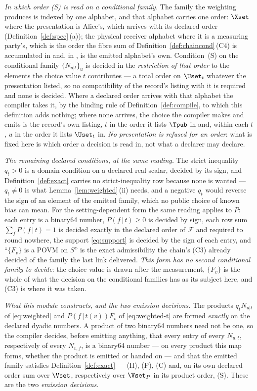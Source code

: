 \begin{definition}
\emph{In which order (S) is read on a conditional family.} The family the
weighting produces is indexed by one alphabet, and that alphabet carries one
order: $\Xset$ where the presentation is Alice's, which arrives with its
declared order (Definition~\ref{def:spec}\,(a)); the physical receiver
alphabet where it is a measuring party's, which is the order the fibre sum of
Definition~\ref{def:chaincond}\,(C4) is accumulated in and, in , is
the emitted alphabet's own. Condition~(S) on the conditional family
$\{N_{u|t}\}_u$ is decided in the \emph{restriction of that order} to the
elements the choice value $t$ contributes --- a total order on $\Uset_t$
whatever the presentation listed, so no compatibility of the record's listing
with it is required and none is decided. Where a declared order arrives with
that alphabet the compiler takes it, by the binding rule of
Definition~\ref{def:compile}, to which this definition adds nothing; where
none arrives, the choice the compiler makes and emits is the record's own
listing, $t$ in the order it lists $\Tpub$ in and, within each $t$, $u$ in the
order it lists $\Uset_t$ in. \emph{No presentation is refused for an order}:
what is fixed here is which order a decision is read in, not what a declarer
may declare.

\emph{The remaining declared conditions, at the same reading.} The strict
inequality $q_t>0$ is a domain condition on a declared real scalar, decided by
its sign, and Definition~\ref{def:exact} carries no
strict-inequality row because none is wanted --- $q_t\ne0$ is what
Lemma~\ref{lem:weighted}\,(ii) needs, and a negative $q_t$ would reverse the
sign of an element of the emitted family, which no public choice of known bias
can mean. For the setting-dependent form the same reading applies to $P$: each
entry is a binary64 number, $P(f\,|\,t)\ge0$ is decided by sign, each row sum
$\sum_fP(f\,|\,t)=1$ is decided exactly in the declared order of
$\mathcal{F}$ and required to round nowhere, the support \eqref{eq:support}
is decided by the sign of each entry, and ``$\{F_v\}$ is a POVM on $S$'' is
the exact admissibility the chain's (C3) already decided of the family the
last link delivered. \emph{This form has no second conditional family to
decide}: the choice value is drawn after the measurement, $\{F_v\}$ is the
whole of what the decision on the conditional families has as its subject
here, and (C3) is where it was taken.

\emph{What this module constructs, and the two emission decisions.} The
products $q_tN_{u|t}$ of \eqref{eq:weighted} and $P(f\,|\,t(v))F_v$ of
\eqref{eq:weighted-t} are formed \emph{exactly} on the declared dyadic
numbers. A product of two binary64 numbers need not be one, so the compiler
decides, before emitting anything, that every entry of every $N_{u,t}$,
respectively of every $N_{v,f}$, is a binary64 number --- on every product
this map forms, whether the product is emitted or handed on --- and that the
emitted family satisfies Definition~\ref{def:exact} --- (H), (P), (C) and, on
its own declared-order sum over $\Vset$, respectively over $\Vset_P$ in its
product order, (S). These are the two \emph{emission decisions}.


\end{definition}
